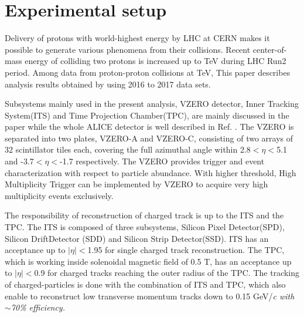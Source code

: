 \documentclass[ALICE,manyauthors]{cernphprep}
\begin{document}

\section{Experimental setup}

Delivery of protons with world-highest energy by LHC at CERN makes it possible to generate various phenomena from their collisions. Recent center-of-mass energy of colliding two protons is increased up to \unit[13]{TeV} during LHC Run2 period. Among data from proton-proton collisions at \unit[13]{TeV}, This paper describes analysis results obtained by using 2016 to 2017 data sets.

Subsystems mainly used in the present analysis, VZERO detector, Inner Tracking System(ITS) and Time Projection Chamber(TPC), are mainly discussed in the paper while the whole ALICE detector is well described in Ref. \cite{ALICEdet}. The VZERO is separated into two plates, VZERO-A and VZERO-C, consisting of two arrays of 32 scintillator tiles each, covering the full azimuthal angle within 2.8$<\eta<$5.1 and -3.7$<\eta<$-1.7 respectively. The VZERO provides trigger and event characterization with respect to particle abundance. With higher threshold, High Multiplicity Trigger can be implemented by VZERO to acquire very high multiplicity events exclusively.

The responsibility of reconstruction of charged track is up to the ITS and the TPC. The ITS is composed of three subsystems, Silicon Pixel Detector(SPD), Silicon DriftDetector (SDD) and Silicon Strip Detector(SSD). ITS has an acceptance up to $|\eta|<$1.95 for single charged track reconstruction. The TPC, which is working inside solenoidal magnetic field of 0.5 T, has an acceptance up to $|\eta|<$0.9 for charged tracks reaching the outer radius of the TPC. The tracking of charged-particles is done with the combination of ITS and TPC, which also enable to reconstruct low transverse momentum tracks down to 0.15 GeV/\it{c}\rm{} with $\sim$70\% efficiency.
\end{document}
